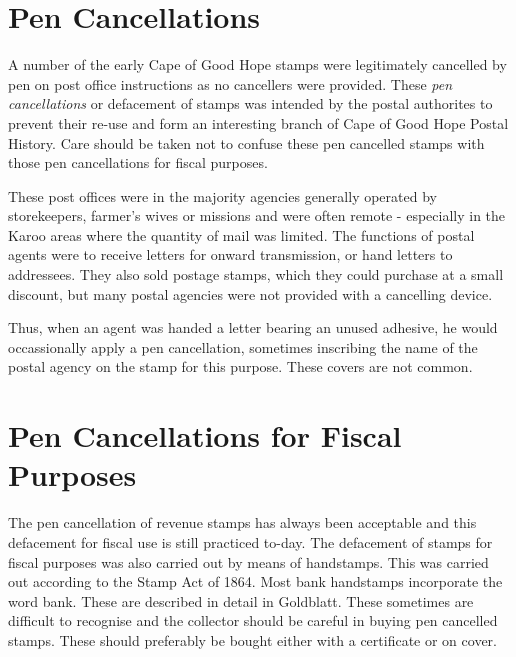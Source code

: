 \section{Pen Cancellations}

A number of the early Cape of Good Hope stamps were legitimately 
cancelled by pen on post office instructions as no cancellers 
were provided. These \textit{pen cancellations} or defacement of stamps was
intended by the postal authorites to prevent their re-use and 
form an interesting branch of Cape of Good Hope Postal History. 
Care should be taken not to confuse these pen cancelled stamps with 
those pen cancellations for fiscal purposes.


   
These post offices were in the majority agencies generally operated by 
storekeepers, farmer's wives or missions and were often remote - 
especially in the Karoo areas where the quantity of mail was limited. 
The functions of postal agents were to receive letters for onward 
transmission, or hand letters to addressees. They also sold postage 
stamps, which they could purchase at a small discount, but many 
postal agencies were not provided with a cancelling device.

Thus, when an agent was handed a letter bearing an unused adhesive, 
he would occassionally apply a pen cancellation, sometimes inscribing 
the name of the postal agency on the stamp for this purpose. These 
covers are not common.

\section{Pen Cancellations for Fiscal Purposes}

The pen cancellation of revenue stamps has always been acceptable 
and this defacement for fiscal use is still practiced to-day. 
The defacement of stamps for fiscal purposes was also carried out 
by means of handstamps. This was carried out according to the 
Stamp Act of 1864. Most bank handstamps incorporate the word bank. 
These are described in detail in Goldblatt. These sometimes are 
difficult to recognise and the collector should be careful in buying 
pen cancelled stamps. These should preferably be bought either with 
a certificate or on cover.

